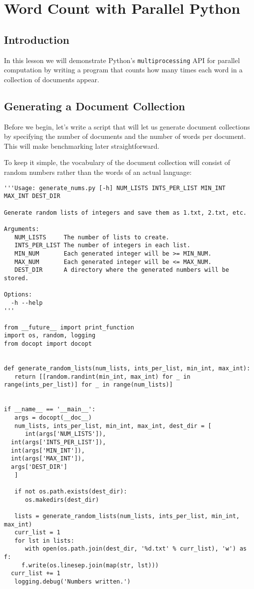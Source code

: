 \section{Word Count with Parallel Python}\label{word-count-1-parallel-python}

\subsection{Introduction}

In this lesson we will demonstrate Python's \texttt{multiprocessing} API
for parallel computation by writing a program that counts how many times
each word in a collection of documents appear.

\subsection{Generating a Document Collection}

Before we begin, let's write a script that will let us generate document
collections by specifying the number of documents and the number of
words per document. This will make benchmarking later straightforward.

To keep it simple, the vocabulary of the document collection will
consist of random numbers rather than the words of an actual language:

\begin{lstlisting}
'''Usage: generate_nums.py [-h] NUM_LISTS INTS_PER_LIST MIN_INT MAX_INT DEST_DIR

Generate random lists of integers and save them as 1.txt, 2.txt, etc.

Arguments:
   NUM_LISTS     The number of lists to create.
   INTS_PER_LIST The number of integers in each list.
   MIN_NUM       Each generated integer will be >= MIN_NUM.
   MAX_NUM       Each generated integer will be <= MAX_NUM.
   DEST_DIR      A directory where the generated numbers will be stored.

Options:
  -h --help
'''

from __future__ import print_function
import os, random, logging
from docopt import docopt


def generate_random_lists(num_lists, ints_per_list, min_int, max_int):
   return [[random.randint(min_int, max_int) for _ in range(ints_per_list)] for _ in range(num_lists)]


if __name__ == '__main__':
   args = docopt(__doc__)
   num_lists, ints_per_list, min_int, max_int, dest_dir = [
      int(args['NUM_LISTS']),
  int(args['INTS_PER_LIST']),
  int(args['MIN_INT']),
  int(args['MAX_INT']),
  args['DEST_DIR']
   ]

   if not os.path.exists(dest_dir):
      os.makedirs(dest_dir)

   lists = generate_random_lists(num_lists, ints_per_list, min_int, max_int)
   curr_list = 1
   for lst in lists:
      with open(os.path.join(dest_dir, '%d.txt' % curr_list), 'w') as f:
     f.write(os.linesep.join(map(str, lst)))
  curr_list += 1
   logging.debug('Numbers written.')
\end{lstlisting}

